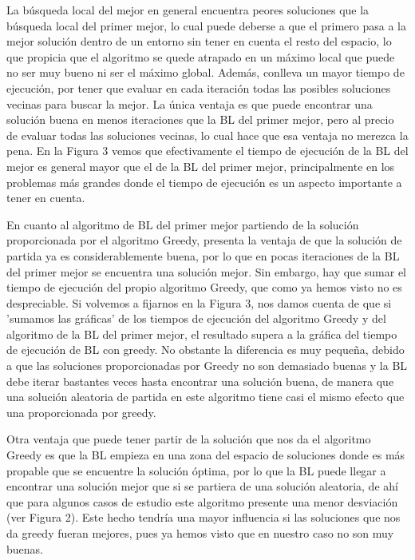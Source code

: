 \documentclass[11pt,a4paper]{article}
\begin{document}
	 La búsqueda local del mejor en general encuentra peores soluciones que la búsqueda local del primer mejor, lo cual puede deberse a que el primero pasa a la mejor solución dentro de un entorno sin tener en cuenta el resto del espacio, lo que propicia que el algoritmo se quede atrapado en un máximo local que puede no ser muy bueno ni ser el máximo global. Además, conlleva un mayor tiempo de ejecución, por tener que evaluar en cada iteración todas las posibles soluciones vecinas para buscar la mejor. La única ventaja es que puede encontrar una solución buena en menos iteraciones que la BL del primer mejor, pero al precio de evaluar todas las soluciones vecinas, lo cual hace que esa ventaja no merezca la pena. En la Figura 3 vemos que efectivamente el tiempo de ejecución de la BL del mejor es general mayor que el de la BL del primer mejor, principalmente en los problemas más grandes donde el tiempo de ejecución es un aspecto importante a tener en cuenta. 
	 
	 En cuanto al algoritmo de BL del primer mejor partiendo de la solución proporcionada por el algoritmo Greedy, presenta la ventaja de que la solución de partida ya es considerablemente buena, por lo que en pocas iteraciones de la BL del primer mejor se encuentra una solución mejor. Sin embargo, hay que sumar el tiempo de ejecución del propio algoritmo Greedy, que como ya hemos visto no es despreciable. Si volvemos a fijarnos en la Figura 3, nos damos cuenta de que si 'sumamos las gráficas' de los tiempos de ejecución del algoritmo Greedy y del algoritmo de la BL del primer mejor, el resultado supera a la gráfica del tiempo de ejecución de BL con greedy. No obstante la diferencia es muy pequeña, debido a que las soluciones proporcionadas por Greedy no son demasiado buenas y la BL debe iterar bastantes veces hasta encontrar una solución buena, de manera que una solución aleatoria de partida en este algoritmo tiene casi el mismo efecto que una proporcionada por greedy.
	 
	 Otra ventaja que puede tener partir de la solución que nos da el algoritmo Greedy es que la BL empieza en una zona del espacio de soluciones donde es más propable que se encuentre la solución óptima, por lo que la BL puede llegar a encontrar una solución mejor que si se partiera de una solución aleatoria, de ahí que para algunos casos de estudio este algoritmo presente una menor desviación (ver Figura 2). Este hecho tendría una mayor influencia si las soluciones que nos da greedy fueran mejores, pues ya hemos visto que en nuestro caso no son muy buenas. 
	 
\end{document}

